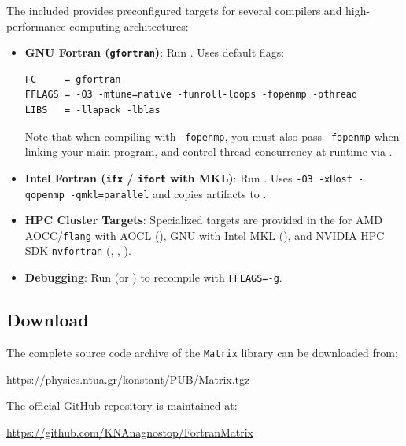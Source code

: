 \begin{notebox}
The included  provides preconfigured targets for several compilers and high-performance computing architectures:
\begin{itemize}
  \item \textbf{GNU Fortran (\texttt{gfortran})}: Run . Uses default flags:
\lstset{language=bash}
\begin{lstlisting}
FC     = gfortran
FFLAGS = -O3 -mtune=native -funroll-loops -fopenmp -pthread
LIBS   = -llapack -lblas
\end{lstlisting}
  Note that when compiling with \texttt{-fopenmp}, you must also pass \texttt{-fopenmp} when linking your main program, and control thread concurrency at runtime via .
  \item \textbf{Intel Fortran (\texttt{ifx} / \texttt{ifort} with MKL)}: Run . Uses \texttt{-O3 -xHost -qopenmp -qmkl=parallel} and copies artifacts to .
  \item \textbf{HPC Cluster Targets}: Specialized targets are provided in the  for AMD AOCC/\texttt{flang} with AOCL (), GNU with Intel MKL (), and NVIDIA HPC SDK \texttt{nvfortran} (, , ).
  \item \textbf{Debugging}: Run  (or ) to recompile with \texttt{FFLAGS=-g}.
\end{itemize}
\end{notebox}

\subsection{Download}
\label{subsec:download}

The complete source code archive of the \texttt{Matrix} library can be downloaded from:
\begin{center}
  \url{https://physics.ntua.gr/konstant/PUB/Matrix.tgz}
\end{center}
The official GitHub repository is maintained at:
\begin{center}
  \url{https://github.com/KNAnagnostop/FortranMatrix}
\end{center}

